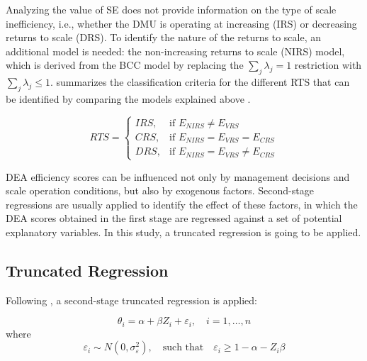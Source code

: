 Analyzing the value of SE does not provide information on the type of scale inefficiency, i.e., whether
the DMU is operating at increasing (IRS) or decreasing returns to scale (DRS). To identify the nature of the returns to
scale, an additional model is needed: the non-increasing returns to scale (NIRS) model, which is derived
from the BCC model by replacing the \(\sum_j \lambda_j = 1\) restriction with \(\sum_j \lambda_j \leq 1\).  summarizes the classification criteria for the different RTS that can be identified
by comparing the models explained above \cite{huguenin2012}.
\vspace{-0.5cm}

\begin{equation}
\label{eq:rts_definition}
RTS =
\begin{cases}
IRS, & \text{if } E_{NIRS} \neq E_{VRS} \\
CRS, & \text{if } E_{NIRS} = E_{VRS} = E_{CRS} \\
DRS, & \text{if } E_{NIRS} = E_{VRS} \neq E_{CRS}
\end{cases}
\end{equation}
 \vspace{-0.3cm}

DEA efficiency scores can be influenced not only by management decisions and scale
operation conditions, but also by exogenous factors. Second-stage regressions are usually
applied to identify the effect of these factors, in which the DEA scores obtained in the first
stage are regressed against a set of potential explanatory variables. In this study, a truncated regression
is going to be applied.

\subsection{Truncated Regression} 
\label{truncreg}

Following \cite{simar2007}, a second-stage truncated regression is applied:
\vspace{-0.3cm}

\begin{equation}
\label{eq:regression}
\theta_i=\alpha+\beta Z_i + \varepsilon_i, \quad i=1,\ldots,n   
\end{equation}
\vspace{-0.1cm}
where
\vspace{-0.1cm}
\begin{equation}
\label{eq:noise}
\varepsilon_i \sim N(0, \sigma_\varepsilon^2), \quad \text{such that} \quad \varepsilon_i \geq 1 - \alpha - Z_i \beta
\end{equation}
\vspace{-0.6cm}

